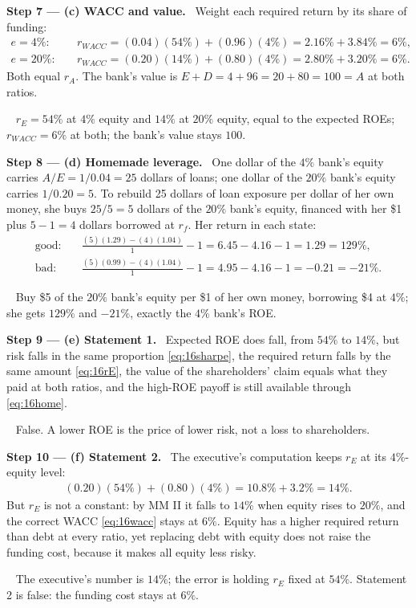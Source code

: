 \documentclass[11pt,a4paper]{article}
\numberwithin{equation}{section}
\newcommand{\step}[2]{\par\smallskip\noindent\textbf{Step #1 --- #2.}~}
\newcommand{\answer}[1]{\par\smallskip\noindent\fbox{\textbf{Answer #1.}}~}
\begin{document}
\step{7}{(c) WACC and value} Weight each required return by its share of funding:
\begin{align}
  e=4\%:&\quad r_{WACC}=(0.04)(54\%)+(0.96)(4\%)=2.16\%+3.84\%=6\%, \label{eq:16wacc}\\
  e=20\%:&\quad r_{WACC}=(0.20)(14\%)+(0.80)(4\%)=2.80\%+3.20\%=6\%. \nonumber
\end{align}
Both equal $r_A$. The bank's value is $E+D=4+96=20+80=100=A$ at both ratios.
\answer{(c)} $r_E=54\%$ at $4\%$ equity and $14\%$ at $20\%$ equity, equal to the expected ROEs;
$r_{WACC}=6\%$ at both; the bank's value stays $100$.

\step{8}{(d) Homemade leverage} One dollar of the $4\%$ bank's equity carries $A/E=1/0.04=25$ dollars of
loans; one dollar of the $20\%$ bank's equity carries $1/0.20=5$. To rebuild 25 dollars of loan exposure
per dollar of her own money, she buys $25/5=5$ dollars of the $20\%$ bank's equity, financed with her
\$1 plus $5-1=4$ dollars borrowed at $r_f$. Her return in each state:
\begin{align}
  \text{good:}\quad &\frac{(5)(1.29)-(4)(1.04)}{1}-1=6.45-4.16-1=1.29=129\%, \nonumber\\
  \text{bad:}\quad &\frac{(5)(0.99)-(4)(1.04)}{1}-1=4.95-4.16-1=-0.21=-21\%. \label{eq:16home}
\end{align}
\answer{(d)} Buy \$5 of the $20\%$ bank's equity per \$1 of her own money, borrowing \$4 at $4\%$; she
gets $129\%$ and $-21\%$, exactly the $4\%$ bank's ROE.

\step{9}{(e) Statement 1} Expected ROE does fall, from $54\%$ to $14\%$, but risk falls in the same
proportion \eqref{eq:16sharpe}, the required return falls by the same amount \eqref{eq:16rE}, the value of
the shareholders' claim equals what they paid at both ratios, and the high-ROE payoff is still
available through \eqref{eq:16home}.
\answer{(e)} False. A lower ROE is the price of lower risk, not a loss to shareholders.

\step{10}{(f) Statement 2} The executive's computation keeps $r_E$ at its $4\%$-equity level:
\begin{align}
  (0.20)(54\%)+(0.80)(4\%)=10.8\%+3.2\%=14\%. \label{eq:16wrong}
\end{align}
But $r_E$ is not a constant: by MM II it falls to $14\%$ when equity rises to $20\%$, and the correct
WACC \eqref{eq:16wacc} stays at $6\%$. Equity has a higher required return than debt at every ratio,
yet replacing debt with equity does not raise the funding cost, because it makes all equity less
risky.
\answer{(f)} The executive's number is $14\%$; the error is holding $r_E$ fixed at $54\%$. Statement 2
is false: the funding cost stays at $6\%$.
\end{document}
